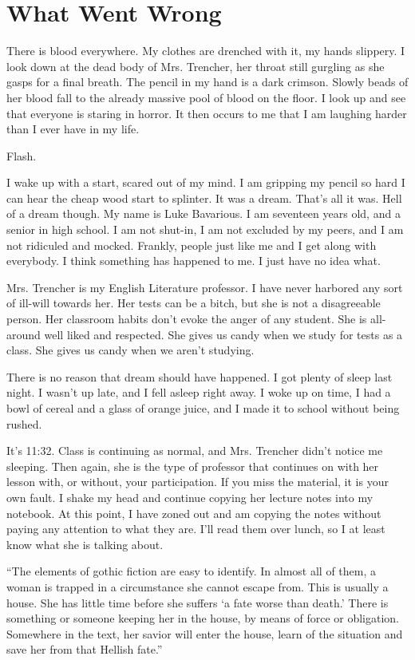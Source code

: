 \chapter{What Went Wrong}



There is blood everywhere. My clothes are drenched with it, my
hands slippery. I look down at the dead body of Mrs. Trencher, her
throat still gurgling as she gasps for a final breath. The pencil
in my hand is a dark crimson. Slowly beads of her blood fall to the
already massive pool of blood on the floor. I look up and see that
everyone is staring in horror. It then occurs to me that I am
laughing harder than I ever have in my life.

Flash.

I wake up with a start, scared out of my mind. I am gripping my
pencil so hard I can hear the cheap wood start to splinter. It was
a dream. That's all it was. Hell of a dream though. My name
is Luke Bavarious. I am seventeen years old, and a senior in high
school. I am not shut-in, I am not excluded by my peers, and I am
not ridiculed and mocked. Frankly, people just like me and I get
along with everybody. I think something has happened to me. I just
have no idea what.

Mrs. Trencher is my English Literature professor. I have never
harbored any sort of ill-will towards her. Her tests can be a
bitch, but she is not a disagreeable person. Her classroom habits
don't evoke the anger of any student. She is all-around well
liked and respected. She gives us candy when we study for tests as
a class. She gives us candy when we aren't studying.

There is no reason that dream should have happened. I got plenty of
sleep last night. I wasn't up late, and I fell asleep right
away. I woke up on time, I had a bowl of cereal and a glass of
orange juice, and I made it to school without being rushed.

It's 11:32. Class is continuing as normal, and Mrs. Trencher
didn't notice me sleeping. Then again, she is the type of
professor that continues on with her lesson with, or without, your
participation. If you miss the material, it is your own fault. I
shake my head and continue copying her lecture notes into my
notebook. At this point, I have zoned out and am copying the notes
without paying any attention to what they are. I'll read them
over lunch, so I at least know what she is talking about.

``The elements of gothic fiction are easy to identify. In
almost all of them, a woman is trapped in a circumstance she cannot
escape from. This is usually a house. She has little time before
she suffers `a fate worse than death.' There is
something or someone keeping her in the house, by means of force or
obligation. Somewhere in the text, her savior will enter the house,
learn of the situation and save her from that Hellish
fate.''



